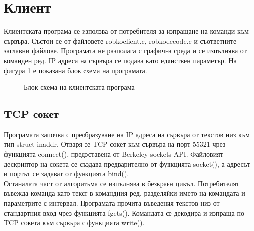 \section{Клиент}
Клиентската програма се използва от потребителя за изпращане на команди към сървъра. Състои се от файловете robko\textunderscore client.c, robko\textunderscore decode.c и съответните заглавни файлове. Програмата не разполага с графична среда и се изпълнява от команден ред. IP адреса на сървъра се подава като единствен параметър. На фигура \ref{fig:flch_client} е показана блок схема на програмата.
\begin{figure}[!htb]
    \centering
    \caption{Блок схема на клиентската програма}
    \label{fig:flch_client}
\end{figure}
\subsection{TCP сокет}
Програмата започва с преобразуване на IP адреса на сървъра от текстов низ към тип struct in\textunderscore addr. Отваря се TCP сокет към сървъра на порт 55321 чрез функцията connect(), предоставена от Berkeley sockets API. Файловият дескриптор на сокета се създава предварително от функцията socket(), а адресът и портът се задават от функцията bind().\\
\indent{}
Останалата част от алгоритъма се изпълнява в безкраен цикъл. Потребителят въвежда команда като текст в командния ред, разделяйки името на командата и параметрите с интервал. Програмата прочита въведения текстов низ от стандартния вход чрез функцията fgets(). Командата се декодира и изпраща по TCP сокета към сървъра с функцията write().
